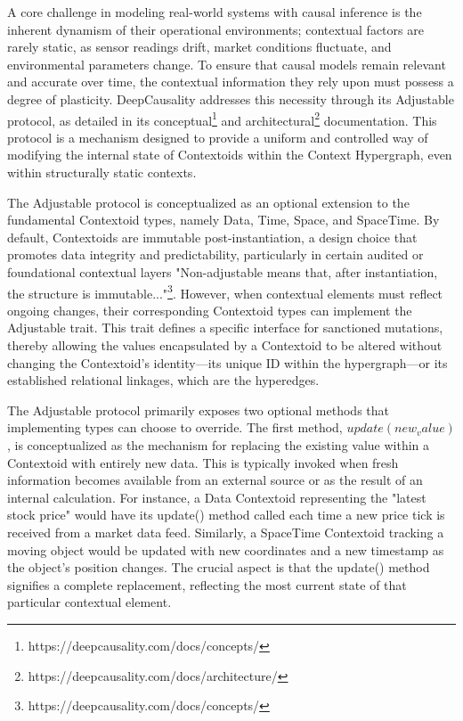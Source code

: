 A core challenge in modeling real-world systems with causal inference is the inherent dynamism of their operational environments; contextual factors are rarely static, as sensor readings drift, market conditions fluctuate, and environmental parameters change. To ensure that causal models remain relevant and accurate over time, the contextual information they rely upon must possess a degree of plasticity. DeepCausality addresses this necessity through its Adjustable protocol, as detailed in its conceptual\footnote{https://deepcausality.com/docs/concepts/} and architectural\footnote{https://deepcausality.com/docs/architecture/} documentation. This protocol is a mechanism designed to provide a uniform and controlled way of modifying the internal state of Contextoids within the Context Hypergraph, even within structurally static contexts.

The Adjustable protocol is conceptualized as an optional extension to the fundamental Contextoid types, namely Data, Time, Space, and SpaceTime. By default, Contextoids are immutable post-instantiation, a design choice that promotes data integrity and predictability, particularly in certain audited or foundational contextual layers  "Non-adjustable means that, after instantiation, the structure is immutable..."\footnote{https://deepcausality.com/docs/concepts/}. However, when contextual elements must reflect ongoing changes, their corresponding Contextoid types can implement the Adjustable trait. This trait defines a specific interface for sanctioned mutations, thereby allowing the values encapsulated by a Contextoid to be altered without changing the Contextoid's identity—its unique ID within the hypergraph—or its established relational linkages, which are the hyperedges.

The Adjustable protocol primarily exposes two optional methods that implementing types can choose to override. The first method, $update(new_value)$, is conceptualized as the mechanism for replacing the existing value within a Contextoid with entirely new data. This is typically invoked when fresh information becomes available from an external source or as the result of an internal calculation. For instance, a Data Contextoid representing the "latest stock price" would have its update() method called each time a new price tick is received from a market data feed. Similarly, a SpaceTime Contextoid tracking a moving object would be updated with new coordinates and a new timestamp as the object's position changes. The crucial aspect is that the update() method signifies a complete replacement, reflecting the most current state of that particular contextual element.

